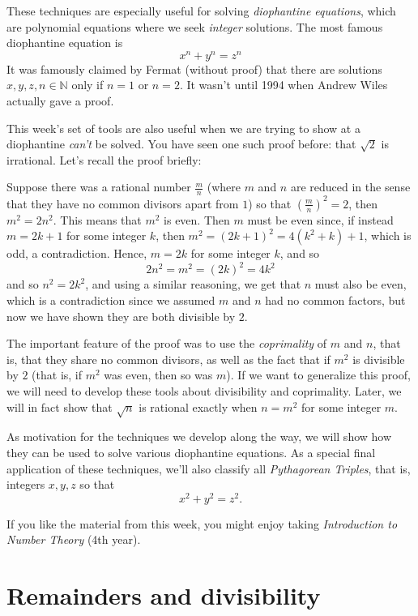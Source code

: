 \documentclass[11pt,dvipsnames]{book}
\numberwithin{equation}{section} %
\numberwithin{figure}{section} %
\numberwithin{table}{section} %
\begin{document}
These techniques are especially useful for solving {\it diophantine equations}, which are polynomial equations where we seek {\it integer} solutions. The most famous diophantine equation is 
\[
x^{n}+y^{n}=z^{n}\]
It was famously claimed by Fermat (without proof) that there are solutions  $x,y,z,n\in\mathbb{N}$ only if $n=1$ or $n=2$. It wasn't until 1994 when Andrew Wiles actually gave a proof. 

This week's set of tools are also useful when we are trying to show at a diophantine {\it can't} be solved. You have seen one such proof before: that $\sqrt{2}$ is irrational. Let's recall the proof briefly:

Suppose there was a rational number $\frac{m}{n}$ (where $m$ and $n$ are reduced in the sense that they have no common divisors apart from $1$) so that $\left(\frac{m}{n}\right)^2=2$, then $m^2=2n^2$. This means that $m^2$ is even. Then $m$ must be even since, if instead $m=2k+1$ for some integer $k$, then $m^2=(2k+1)^2=4(k^2+k)+1$, which is odd, a contradiction. Hence, $m=2k$ for some integer $k$, and so
\[
2n^2=m^2=(2k)^2=4k^2\]
and so $n^2=2k^2$, and using a similar reasoning, we get that $n$ must also be even, which is a contradiction since we assumed $m$ and $n$ had no common factors, but now we have shown they are both divisible by $2$. 

The important feature of the proof was to use the {\it coprimality} of $m$ and $n$, that is, that they share no common divisors, as well as the fact that if $m^2$ is divisible by $2$ (that is, if $m^2$ was even, then so was $m$). If we want to generalize this proof, we will need to develop  these tools about divisibility and coprimality. Later, we will in fact show that $\sqrt{n}$ is rational exactly when $n=m^2$ for some integer $m$. 



As motivation for the techniques we develop along the way, we will show how they can be used to solve various diophantine equations. As a special final application of these techniques, we'll also classify all {\it Pythagorean Triples}, that is, integers $x,y,z$ so that 
\[
x^2+y^2=z^2.\]


If you like the material from this week, you might enjoy taking {\it Introduction to Number Theory} (4th year).

\section{Remainders and divisibility }
\end{document}
